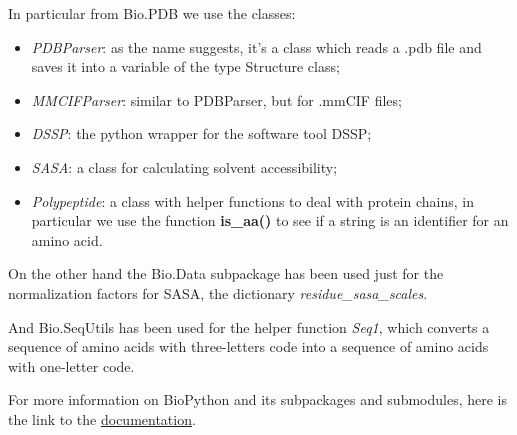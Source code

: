 In particular from Bio.PDB we use the classes:
\begin{itemize}
    \item \textit{PDBParser}: as the name suggests, it's a class which reads a .pdb file and saves it into a variable of the type Structure class;
    \item \textit{MMCIFParser}: similar to PDBParser, but for .mmCIF files;
    \item \textit{DSSP}: the python wrapper for the software tool DSSP;
    \item \textit{SASA}: a class for calculating solvent accessibility;
    \item \textit{Polypeptide}: a class with helper functions to deal with protein chains, in particular we use the function \textbf{is\_aa()} to see if a string is an identifier for an amino acid.
\end{itemize}

On the other hand the Bio.Data subpackage has been used just for the normalization factors for SASA, the dictionary \textit{residue\_sasa\_scales}. 

And Bio.SeqUtils has been used for the helper function \textit{Seq1}, which converts a sequence of amino acids with three-letters code into a sequence of amino acids with one-letter code.

For more information on BioPython and its subpackages and submodules, here is the link to the  \underline{\href{https://biopython.org/docs/dev/api/index.html}{documentation}}.